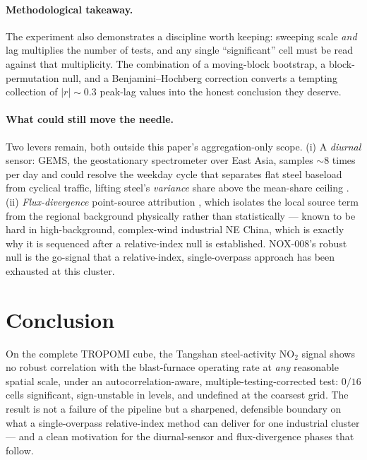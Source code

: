 \documentclass[11pt,a4paper]{article}
\providecommand{\ce}[1]{\ensuremath{\mathrm{#1}}}
\begin{document}
\paragraph{Methodological takeaway.} The experiment also demonstrates a discipline worth keeping:
sweeping scale \emph{and} lag multiplies the number of tests, and any single ``significant'' cell
must be read against that multiplicity. The combination of a moving-block bootstrap, a
block-permutation null, and a Benjamini--Hochberg correction \citep{morris_zhang_2019} converts a
tempting collection of $|r|\!\sim\!0.3$ peak-lag values into the honest conclusion they deserve.

\paragraph{What could still move the needle.} Two levers remain, both outside this paper's
aggregation-only scope. (i) A \emph{diurnal} sensor: GEMS, the geostationary spectrometer over East
Asia, samples $\sim$8 times per day and could resolve the weekday cycle that separates flat steel
baseload from cyclical traffic, lifting steel's \emph{variance} share above the mean-share ceiling
\citep{park_2025_gems_gan}. (ii) \emph{Flux-divergence} point-source attribution
\citep{beirle_2021,beirle_2023}, which isolates the local source term from the regional background
physically rather than statistically --- known to be hard in high-background, complex-wind
industrial NE China, which is exactly why it is sequenced after a relative-index null is
established. NOX-008's robust null is the go-signal that a relative-index, single-overpass approach
has been exhausted at this cluster.

\section{Conclusion}
\label{sec:conclusion}
On the complete TROPOMI cube, the Tangshan steel-activity \ce{NO_2} signal shows no robust
correlation with the blast-furnace operating rate at \emph{any} reasonable spatial scale, under an
autocorrelation-aware, multiple-testing-corrected test: $0/16$ cells significant, sign-unstable in
levels, and undefined at the coarsest grid. The result is not a failure of the pipeline but a
sharpened, defensible boundary on what a single-overpass relative-index method can deliver for one
industrial cluster --- and a clean motivation for the diurnal-sensor and flux-divergence phases that
follow.
\end{document}
